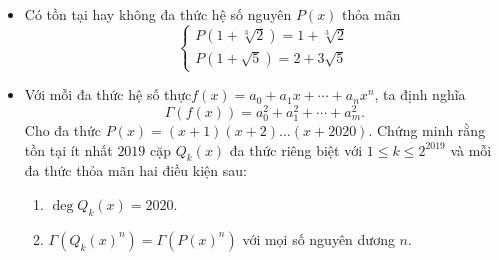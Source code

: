 \documentclass[11pt]{scrartcl}
\begin{document}
\begin{itemize}[label=, leftmargin=0em, itemsep=-0em]
        \item \begin{btvn}
            Có tồn tại hay không đa thức hệ số nguyên $P(x)$ thỏa mãn\[ \begin{cases} P(1+\sqrt[3]{2})=1+\sqrt[3]{2}\\ P(1+\sqrt{5})=2+3\sqrt{5}\end{cases} \]
        \end{btvn}
        \item \begin{btvn}
            Với mỗi đa thức hệ số thực$f(x)={{a}_{0}}+{{a}_{1}}x+\cdots +{{a}_{n}}{{x}^{n}}$, ta định nghĩa 
            $$\Gamma (f(x))=a_{0}^{2}+a_{1}^{2}+\cdots +a_{m}^{2}.$$
            Cho đa thức $P(x)=(x+1)(x+2)\ldots (x+2020).$ Chứng minh rằng tồn tại ít nhất $2019$ cặp ${{Q}_{k}}(x)$ đa thức riêng biệt với $1\le k\le {{2}^{2019}}$ và mỗi đa thức thỏa mãn hai điều kiện sau:
            \begin{enumerate}
                \item $\deg {{Q}_{k}}(x)=2020.$
                \item $\Gamma \left( {{Q}_{k}}{{(x)}^{n}} \right)=\Gamma \left( P{{(x)}^{n}} \right)$ với mọi số nguyên dương $n$.
            \end{enumerate}

        \end{btvn}
        

\end{itemize}
\end{document}
